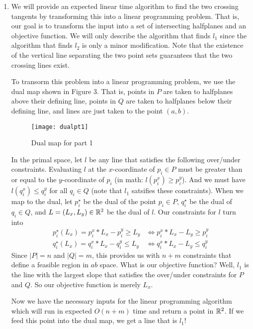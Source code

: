 \documentclass[11pt]{article}
\begin{document}
\answer
\begin{enumerate}

    \item We will provide an expected linear time algorithm to find the two crossing tangents by transforming this into a linear programming problem.
    That is, our goal is to transform the input into a set of intersecting halfplanes and an objective function.
    We will only describe the algorithm that finds $l_1$ since the algorithm that finds $l_2$ is only a minor modification.
    Note that the existence of the vertical line separating the two point sets guarantees that the two crossing lines exist.

    To transorm this problem into a linear programming problem, we use the dual map shown in Figure 3.
    That is, points in $P$ are taken to halfplanes above their defining line, points in $Q$ are taken to halfplanes below their defining line, and lines are just taken to the point $(a,b)$.

    \begin{figure}[h]
        \centering
        \texttt{[image: dualpt1]}
        \label{fig:dualpt1}
        \caption{Dual map for part 1}
    \end{figure}

    In the primal space, let $l$ be any line that satisfies the following over/under constraints.
    Evaluating $l$ at the $x$-coordinate of $p_i \in P$ must be greater than or equal to the $y$-coordinate of $p_i$ (in math: $l (p_i^x) \geq p_i^y$).
    And we must have $l (q_i^x) \leq q_i^y$ for all $q_i \in Q$ (note that $l_1$ satsifies these constraints).
    When we map to the dual, let $p_i^\star$ be the dual of the point $p_i \in P$, $q_i^\star$ be the dual of $q_i \in Q$, and $L = (L_x, L_y) \in \mathbb{R} ^2$ be the dual of $l$.
    Our constraints for $l$ turn into
    \begin{align}
        p_i^\star (L_x) = p_i^x * L_x - p_i^y \geq L_y &\iff p_i^x * L_x - L_y \geq p_i^y \\
        q_i^\star (L_x) = q_i^x * L_x - q_i^y \leq L_y &\iff q_i^x * L_x - L_y \leq q_i^y
    \end{align}
    Since $|P|=n$ and $|Q|=m$, this provides us with $n+m$ constraints that define a feasible region in $ab$ space.
    What is our objective function?
    Well, $l_1$ is the line with the largest slope that satisfies the over/under constraints for $P$ and $Q$.
    So our objective function is merely $L_x$.

    Now we have the necessary inputs for the linear programming algorithm which will run in expected $O(n+m)$ time and return a point in $\mathbb{R} ^2$.
    If we feed this point into the dual map, we get a line that is $l_1$!


\end{enumerate}
\end{document}
